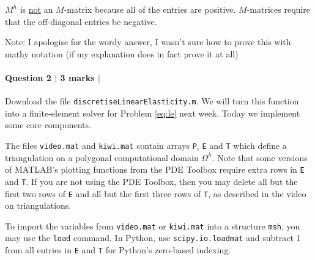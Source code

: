 \documentclass[10pt,letterpaper]{scrartcl}
\begin{document}
$M^h$ is \underline{not} an $M$-matrix because all of the entries are positive. $M$-matrices require that the off-diagonal entries be negative. 

\bigskip
Note: I apologise for the wordy answer, I wasn't sure how to prove this with mathy notation (if my explanation does in fact prove it at all)

\newpage

\paragraph*{Question 2 $\vert$ 3 marks $\vert$ \faFileCodeO}

Download the file \texttt{discretiseLinearElasticity.m}. We will turn this function into a finite-element solver for Problem \eqref{eq:le} next week. Today we implement some core components.

The files \texttt{video.mat} and \texttt{kiwi.mat} contain arrays \texttt{P}, \texttt{E} and \texttt{T} which define a triangulation on a polygonal computational domain $\Omega^h$. Note that some versions of \textsf{MATLAB}'s plotting functions from the PDE Toolbox require extra rows in \texttt{E} and \texttt{T}. If you are not using the PDE Toolbox, then you may delete all but the first two rows of \texttt{E} and all but the first three rows of \texttt{T}, as described in the video on triangulations.

To import the variables from \texttt{video.mat} or \texttt{kiwi.mat} into a structure \texttt{msh}, you may use the \texttt{load} command. In \textsf{Python}, use \texttt{scipy.io.loadmat} and subtract 1 from all entries in \texttt{E} and \texttt{T} for \textsf{Python}'s zero-based indexing.
\end{document}
